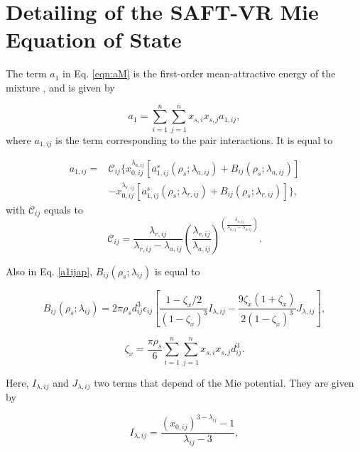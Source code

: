 
\chapter{Detailing of the SAFT-VR Mie Equation of State } \label{restodaseq}
The term $a_{1}$  in Eq. \ref{eqn:aM} is the first-order mean-attractive energy of the mixture \cite{lafitte2013}, and is given by

\begin{equation}
a_{1} = \sum_{i=1}^{n} \sum_{j=1}^{n} x_{s,i} x_{s,j} a_{1,ij},
\end{equation}	
where $a_{1,ij}$ is the term corresponding to the pair interactions. It is equal to

\begin{equation}
\begin{aligned}
a_{1,ij} {}=& \mathcal{C}_{ij} \lbrace x_{0,ij}^{\lambda _{a,ij}} [a_{1,ij}^{s}(\rho _{s}; \lambda _{a,ij}) + B_{ij}(\rho _{s}; \lambda _{a,ij})] \\
& - x_{0,ij}^{\lambda _{r,ij}} [a_{1,ij}^{s}(\rho _{s}; \lambda _{r,ij}) + B_{ij}(\rho _{s}; \lambda _{r,ij})] \rbrace ,
\end{aligned}
\label{a1ijap}
\end{equation}
with $\mathcal{C}_{ij}$ equals to
\begin{equation}
\mathcal{C}_{ij} = \frac{\lambda_{r,ij}}{\lambda_{r,ij} - \lambda_{a,ij}} \left(\frac{\lambda_{r,ij}}{\lambda_{a,ij}} \right)^{\left( \frac{\lambda_{a,ij}}{\lambda_{a,ij} - \lambda_{a,ij}} \right)}.
\end{equation}

Also in Eq. \ref{a1ijap}, $B_{ij}(\rho _{s}; \lambda _{ij})$ is equal to

\begin{equation}
B_{ij}(\rho _{s}; \lambda _{ij}) =  2 \pi \rho _{s} d_{ij}^{3} \epsilon _{ij} \left[\dfrac{1 - \zeta _{x}/2}{(1-\zeta _{x})^3} I_{\lambda , ij} - \dfrac{9 \zeta _{x} (1 + \zeta _{x})}{2(1-\zeta _{x})^3} J_{\lambda , ij} \right],
\end{equation}

\begin{equation}
\zeta _{x} = \frac{\pi \rho _{s}}{6} \sum_{i=1}^{n} \sum_{j=1}^{n} x_{s,i} x_{s,j} d_{ij}^{3} .
\end{equation}

Here, $I_{\lambda , ij}$ and $J_{\lambda , ij}$ two terms that depend of the Mie potential. They are given by

\begin{equation}
I_{\lambda , ij} = \dfrac{ (x_{0,ij})^{3 - \lambda _{ij}} - 1}{\lambda _{ij} -3},
\end{equation}

